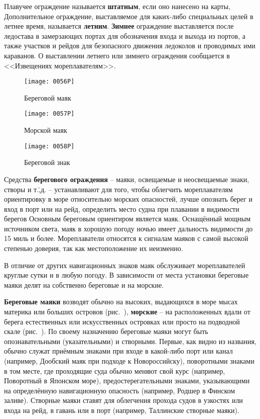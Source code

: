 Плавучее ограждение называется
\textbf{штатным}, если оно нанесено на
карты, Дополнительное ограждение, выставляемое для каких-либо
специальных целей в летнее время, называется
\textbf{летним}. \textbf{Зимнее}
ограждение выставляется после ледостава в замерзающих портах для
обозначения входа и выхода из портов, а также участков и рейдов для
безопасного движения ледоколов и проводимых ими караванов. О
выставлении летнего или зимнего ограждения сообщается в <<Извещениях
мореплавателям>>.

\begin{figure*}[htb]
  \centering{}
  \texttt{[image: 0056P]}
  \caption{Береговой маяк}
  \label{fig:56}
  \endminipage
  \hfill
  \centering{}
  \texttt{[image: 0057P]}
  \caption{Морской маяк}
  \label{fig:57}
  \endminipage
  \hfill
  \centering{}
  \texttt{[image: 0058P]}
  \caption{Береговой знак}
  \label{fig:58}
  \endminipage
\end{figure*}

Средства \textbf{берегового ограждения}
\--- маяки, освещаемые и неосвещаемые знаки, створы и т.\=,д. \---
устанавливают для того, чтобы облегчить мореплавателям ориентировку в
море относительно морских опасностей, лучше опознать берег и вход в
порт или на рейд, определить место судна при плавании в видимости
берегов Основным береговым ориентиром является маяк. Оснащённый мощным
источником света, маяк в хорошую погоду ночью имеет дальность
видимости до 15 миль и более. Мореплаватели относятся к
сигналам маяков с самой высокой степенью доверия, так как
местоположение их неизменно.

В отличие от других навигационных знаков маяк обслуживает
мореплавателей круглые сутки и в любую погоду. В зависимости от места
установки береговые маяки делят на собственно береговые и на морские.

\textbf{Береговые маяки} возводят обычно на высоких, выдающихся в море
мысах материка или больших островов (рис.~), \textbf{морские}
\--- на расположенных вдали от берега естественных или искусственных
островках или просто на подводной скале (рис.~). По своему
назначению береговые маяки могут быть опознавательными (указательными)
и створными. Первые, как видно из названия, обычно служат приёмным
знаками при входе в какой-либо порт или канал (например, Дообский маяк
при подходе к Новороссийску), поворотными знаками в том месте, где
проходящие суда обычно меняют свой курс (например, Поворотный в
Японском море), предостерегательными знаками, указывающими на
определённую навигационную опасность (например, Родшер в Финском
заливе). Створные маяки ставят для облегчения прохода судов в узкостях
или входа на рейд, в гавань или в порт (например, Таллинские створные
маяки).

